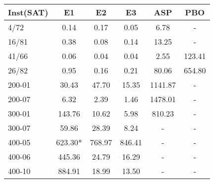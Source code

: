 
\begin{tabular}{ l|ccccc }
Inst(SAT) &E1 &E2 &E3 &ASP    &PBO\\
    \hline
4/72   &0.14   &0.17   &0.05   &6.78   &-\\
16/81  &0.38   &0.08   &0.14   &13.25  &-\\
41/66  &0.06   &0.04   &0.04   &2.55   &123.41\\
26/82  &0.95   &0.16   &0.21   &80.06  &654.80\\
200-01 &30.43  &47.70  &15.35  &1141.87    &-\\
200-07 &6.32   &2.39   &1.46   &1478.01    &-\\
300-01 &143.76 &10.62  &5.98   &810.23 &-\\
300-07 &59.86  &28.39  &8.24   &-  &-\\
400-05 &623.30*    &768.97 &846.41 &-  &-\\
400-06 &445.36 &24.79  &16.29  &-  &-\\
400-10 &884.91 &18.99  &13.50  &-  &-\\
    \hline
\end{tabular}
